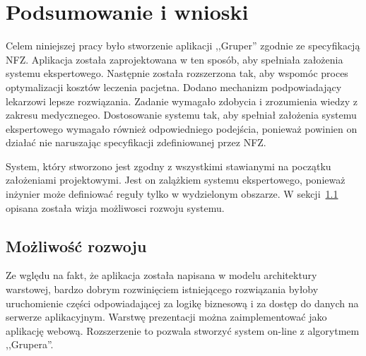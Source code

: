 \chapter{Podsumowanie i wnioski}
\label{cha:podsumowanie}

Celem niniejszej pracy było stworzenie aplikacji ,,Gruper'' zgodnie ze specyfikacją NFZ. Aplikacja została zaprojektowana w ten sposób, aby spełniała założenia systemu ekspertowego. Następnie została rozszerzona tak, aby wspomóc proces optymalizacji kosztów leczenia pacjetna. Dodano mechanizm podpowiadający lekarzowi lepsze rozwiązania. Zadanie wymagało zdobycia i zrozumienia wiedzy z zakresu medycznegeo. Dostosowanie systemu tak, aby spełniał założenia systemu ekspertowego wymagało również odpowiedniego podejścia, ponieważ powinien on działać nie naruszając specyfikacji zdefiniowanej przez NFZ.

System, który stworzono jest zgodny z wszystkimi stawianymi na początku założeniami projektowymi. Jest on zalążkiem systemu ekspertowego, ponieważ inżynier może definiować reguły tylko w wydzielonym obszarze. W sekcji~\ref{sec:mozliwoscRozwoju} opisana została wizja możliwosci rozwoju systemu.


\section{Możliwość rozwoju}
\label{sec:mozliwoscRozwoju}

Ze wględu na fakt, że aplikacja została napisana w modelu architektury warstowej, bardzo dobrym rozwinięciem istniejącego rozwiązania byłoby uruchomienie części odpowiadającej za logikę biznesową i za dostęp do danych na serwerze aplikacyjnym. Warstwę prezentacji można zaimplementować jako aplikację webową. Rozszerzenie to pozwala stworzyć system on-line z algorytmem ,,Grupera''.

